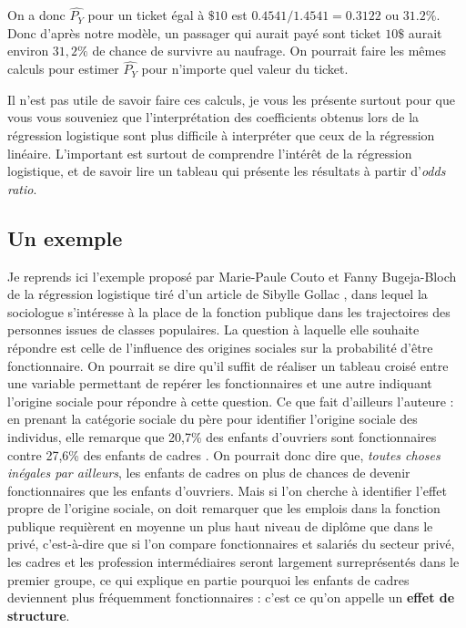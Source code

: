 \documentclass[
  french,
]{book}
\begin{document}
On a donc \(\hat{P_Y}\) pour un ticket égal à \(\$10\) est \(0.4541/1.4541= 0.3122\) ou \(31.2\%\). Donc d'après notre modèle, un passager qui aurait payé sont ticket \(10\$\) aurait environ \(31,2 \%\) de chance de survivre au naufrage. On pourrait faire les mêmes calculs pour estimer \(\hat{P_Y}\) pour n'importe quel valeur du ticket.

Il n'est pas utile de savoir faire ces calculs, je vous les présente surtout pour que vous vous souveniez que l'interprétation des coefficients obtenus lors de la régression logistique sont plus difficile à interpréter que ceux de la régression linéaire. L'important est surtout de comprendre l'intérêt de la régression logistique, et de savoir lire un tableau qui présente les résultats à partir d'\emph{odds ratio}.

\hypertarget{un-exemple-2}{%
\subsection{Un exemple}\label{un-exemple-2}}

Je reprends ici l'exemple proposé par Marie-Paule Couto et Fanny Bugeja-Bloch \citep[p.~100-104]{bugeja-bloch2021} de la régression logistique tiré d'un article de Sibylle Gollac \citep{gollac2005}, dans lequel la sociologue s'intéresse à la place de la fonction publique dans les trajectoires des personnes issues de classes populaires. La question à laquelle elle souhaite répondre est celle de l'influence des origines sociales sur la probabilité d'être fonctionnaire. On pourrait se dire qu'il suffit de réaliser un tableau croisé entre une variable permettant de repérer les fonctionnaires et une autre indiquant l'origine sociale pour répondre à cette question. Ce que fait d'ailleurs l'auteure : en prenant la catégorie sociale du père pour identifier l'origine sociale des individus, elle remarque que 20,7\% des enfants d'ouvriers sont fonctionnaires contre 27,6\% des enfants de cadres \citep[p.~47]{gollac2005}. On pourrait donc dire que, \emph{toutes choses inégales par ailleurs}, les enfants de cadres on plus de chances de devenir fonctionnaires que les enfants d'ouvriers. Mais si l'on cherche à identifier l'effet propre de l'origine sociale, on doit remarquer que les emplois dans la fonction publique requièrent en moyenne un plus haut niveau de diplôme que dans le privé, c'est-à-dire que si l'on compare fonctionnaires et salariés du secteur privé, les cadres et les profession intermédiaires seront largement surreprésentés dans le premier groupe, ce qui explique en partie pourquoi les enfants de cadres deviennent plus fréquemment fonctionnaires : c'est ce qu'on appelle un \textbf{effet de structure}.
\end{document}
